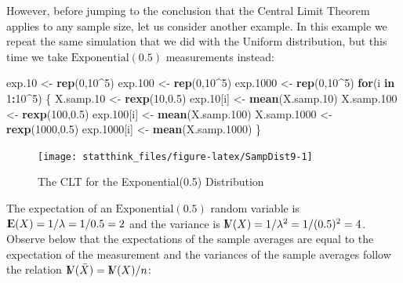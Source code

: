 \documentclass[]{krantz}
\makeatletter
\newenvironment{Shaded}{\begin{snugshade}}{\end{snugshade}}
\newcommand{\ControlFlowTok}[1]{\textcolor[rgb]{0.13,0.29,0.53}{\textbf{#1}}}
\newcommand{\DecValTok}[1]{\textcolor[rgb]{0.00,0.00,0.81}{#1}}
\newcommand{\FloatTok}[1]{\textcolor[rgb]{0.00,0.00,0.81}{#1}}
\newcommand{\KeywordTok}[1]{\textcolor[rgb]{0.13,0.29,0.53}{\textbf{#1}}}
\newcommand{\NormalTok}[1]{#1}
\newcommand{\OperatorTok}[1]{\textcolor[rgb]{0.81,0.36,0.00}{\textbf{#1}}}
\newcommand{\StringTok}[1]{\textcolor[rgb]{0.31,0.60,0.02}{#1}}
\newcommand{\Expec}{{\rm I\kern-.3em E}}
\newcommand{\Var}{{\rm I\kern-.3em V}}
\newenvironment{kframe}{%
\medskip{}
\setlength{\fboxsep}{.8em}
 \def\at@end@of@kframe{}%
 \ifinner\ifhmode%
  \def\at@end@of@kframe{\end{minipage}}%
  \begin{minipage}{\columnwidth}%
 \fi\fi%
 \def\FrameCommand##1{\hskip\@totalleftmargin \hskip-\fboxsep
 \colorbox{shadecolor}{##1}\hskip-\fboxsep
     \hskip-\linewidth \hskip-\@totalleftmargin \hskip\columnwidth}%
 \MakeFramed {\advance\hsize-\width
   \@totalleftmargin\z@ \linewidth\hsize
   \@setminipage}}%
 {\par\unskip\endMakeFramed%
 \at@end@of@kframe}
\renewenvironment{Shaded}{\begin{kframe}}{\end{kframe}}
\theoremstyle{definition}
\theoremstyle{definition}
\theoremstyle{definition}
\theoremstyle{remark}
\makeatother
\begin{document}
However, before jumping to the conclusion that the Central Limit Theorem
applies to any sample size, let us consider another example. In this
example we repeat the same simulation that we did with the Uniform
distribution, but this time we take \(\mathrm{Exponential}(0.5)\)
measurements instead:

\begin{Shaded}
\begin{Highlighting}[]
\NormalTok{exp}\FloatTok{.10}\NormalTok{ <-}\StringTok{ }\KeywordTok{rep}\NormalTok{(}\DecValTok{0}\NormalTok{,}\DecValTok{10}\OperatorTok{^}\DecValTok{5}\NormalTok{)}
\NormalTok{exp}\FloatTok{.100}\NormalTok{ <-}\StringTok{ }\KeywordTok{rep}\NormalTok{(}\DecValTok{0}\NormalTok{,}\DecValTok{10}\OperatorTok{^}\DecValTok{5}\NormalTok{)}
\NormalTok{exp}\FloatTok{.1000}\NormalTok{ <-}\StringTok{ }\KeywordTok{rep}\NormalTok{(}\DecValTok{0}\NormalTok{,}\DecValTok{10}\OperatorTok{^}\DecValTok{5}\NormalTok{)}
\ControlFlowTok{for}\NormalTok{(i }\ControlFlowTok{in} \DecValTok{1}\OperatorTok{:}\DecValTok{10}\OperatorTok{^}\DecValTok{5}\NormalTok{) \{}
\NormalTok{  X.samp}\FloatTok{.10}\NormalTok{ <-}\StringTok{ }\KeywordTok{rexp}\NormalTok{(}\DecValTok{10}\NormalTok{,}\FloatTok{0.5}\NormalTok{)}
\NormalTok{  exp}\FloatTok{.10}\NormalTok{[i] <-}\StringTok{ }\KeywordTok{mean}\NormalTok{(X.samp}\FloatTok{.10}\NormalTok{)}
\NormalTok{  X.samp}\FloatTok{.100}\NormalTok{ <-}\StringTok{ }\KeywordTok{rexp}\NormalTok{(}\DecValTok{100}\NormalTok{,}\FloatTok{0.5}\NormalTok{)}
\NormalTok{  exp}\FloatTok{.100}\NormalTok{[i] <-}\StringTok{ }\KeywordTok{mean}\NormalTok{(X.samp}\FloatTok{.100}\NormalTok{)}
\NormalTok{  X.samp}\FloatTok{.1000}\NormalTok{ <-}\StringTok{ }\KeywordTok{rexp}\NormalTok{(}\DecValTok{1000}\NormalTok{,}\FloatTok{0.5}\NormalTok{)}
\NormalTok{  exp}\FloatTok{.1000}\NormalTok{[i] <-}\StringTok{ }\KeywordTok{mean}\NormalTok{(X.samp}\FloatTok{.1000}\NormalTok{)}
\NormalTok{\}}
\end{Highlighting}
\end{Shaded}

\begin{figure}

{\centering \texttt{[image: statthink\_files/figure-latex/SampDist9-1]} 

}

\caption{The CLT for the Exponential(0.5) Distribution}\label{fig:SampDist9}
\end{figure}

The expectation of an \(\mathrm{Exponential}(0.5)\) random variable is
\(\Expec(X) = 1/\lambda = 1/0.5 = 2\) and the variance is
\(\Var(X) = 1/\lambda^2 = 1/(0.5)^2 = 4\). Observe below that the
expectations of the sample averages are equal to the expectation of the
measurement and the variances of the sample averages follow the relation
\(\Var(\bar X) = \Var (X)/n\):
\end{document}

